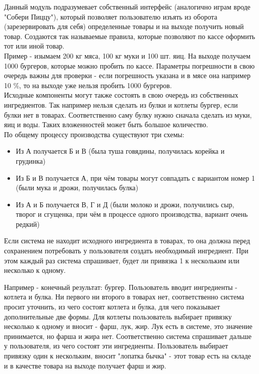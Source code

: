 \documentclass[DIV=calc, paper=a4, fontsize=11pt]{scrartcl} %
\begin{document}
Данный модуль подразумевает собственный интерфейс (аналогично играм вроде "Собери Пиццу"), который позволяет пользователю изъять из оборота (зарезервировать для себя) определенные товары и на выходе получить новый товар. Создаются так называемые правила, которые позволяют по кассе оформить тот или иной товар.
\\[0.5cm]
Пример - изымаем 200 кг мяса, 100 кг муки и 100 шт. яиц. На выходе получаем 1000 бургеров, которые можно пробить по кассе. Параметры погрешности в свою очередь важны для проверки - если погрешность указана и в мясе она например 10 \%, то на выходе уже нельзя пробить 1000 бургеров.
\\[0.5cm]
Исходные компоненты могут также состоять в свою очередь из собственных ингредиентов. Так например нельзя сделать из булки и котлеты бургер, если булки нет в товарах. Соответственно саму булку нужно сначала сделать из муки, яиц и воды. Таких вложенностей может быть большое количество.
\\[0.5cm]
По общему процессу производства существуют три схемы:

\begin{itemize}
	\item Из А получается Б и В (была туша говядины, получилась корейка и грудинка)
	\item Из Б и В получается А, при чём товары могут совпадать с вариантом номер 1 (были мука и дрожи, получилась булка)
	\item Из А и Б получается В, Г и Д (были молоко и дрожи, получились сыр, творог и сгущенка, при чём в процессе одного производства, вариант очень редкий)
\end{itemize}

Если система не находит исходного ингредиента в товарах, то она должна перед сохранением потребовать у пользователя создать необходимый ингредиент. При этом каждый раз система спрашивает, будет ли привязка 1 к нескольким или несколько к одному.

\begin{framed}
	Например - конечный результат: бургер. Пользователь вводит ингредиенты - котлета и булка. Ни первого ни второго в товарах нет, соответственно система просит уточнить, из чего состоят котлета и булка, для чего показывает дополнительные две формы. Для котлеты пользователь выбирает привязку несколько к одному и вносит - фарш, лук, жир. Лук есть в системе, это значение принимается, но фарша и жира нет. Соответственно система спрашивает дальше у пользователя, из чего состоят эти ингредиенты. Пользователь выбирает привязку один к нескольким, вносит "лопатка бычка" - этот товар есть на складе и в качестве товара на выходе получает фарш и жир.
\end{framed}
\end{document}
